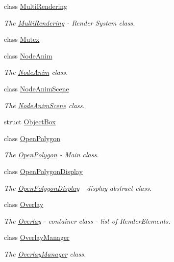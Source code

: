 \begin{DoxyCompactItemize}
class \hyperlink{classEngine_1_1MultiRendering}{Multi\+Rendering}
\begin{DoxyCompactList}\small\item\em The \hyperlink{classEngine_1_1MultiRendering}{Multi\+Rendering} -\/ Render System class. \end{DoxyCompactList}\item 
class \hyperlink{classEngine_1_1Mutex}{Mutex}
\item 
class \hyperlink{classEngine_1_1NodeAnim}{Node\+Anim}
\begin{DoxyCompactList}\small\item\em The \hyperlink{classEngine_1_1NodeAnim}{Node\+Anim} class. \end{DoxyCompactList}\item 
class \hyperlink{classEngine_1_1NodeAnimScene}{Node\+Anim\+Scene}
\begin{DoxyCompactList}\small\item\em The \hyperlink{classEngine_1_1NodeAnimScene}{Node\+Anim\+Scene} class. \end{DoxyCompactList}\item 
struct \hyperlink{structEngine_1_1ObjectBox}{Object\+Box}
\item 
class \hyperlink{classEngine_1_1OpenPolygon}{Open\+Polygon}
\begin{DoxyCompactList}\small\item\em The \hyperlink{classEngine_1_1OpenPolygon}{Open\+Polygon} -\/ Main class. \end{DoxyCompactList}\item 
class \hyperlink{classEngine_1_1OpenPolygonDisplay}{Open\+Polygon\+Display}
\begin{DoxyCompactList}\small\item\em The \hyperlink{classEngine_1_1OpenPolygonDisplay}{Open\+Polygon\+Display} -\/ display abstract class. \end{DoxyCompactList}\item 
class \hyperlink{classEngine_1_1Overlay}{Overlay}
\begin{DoxyCompactList}\small\item\em The \hyperlink{classEngine_1_1Overlay}{Overlay} -\/ container class -\/ list of Render\+Elements. \end{DoxyCompactList}\item 
class \hyperlink{classEngine_1_1OverlayManager}{Overlay\+Manager}
\begin{DoxyCompactList}\small\item\em The \hyperlink{classEngine_1_1OverlayManager}{Overlay\+Manager} class. \end{DoxyCompactList}\item 

\end{DoxyCompactItemize}
